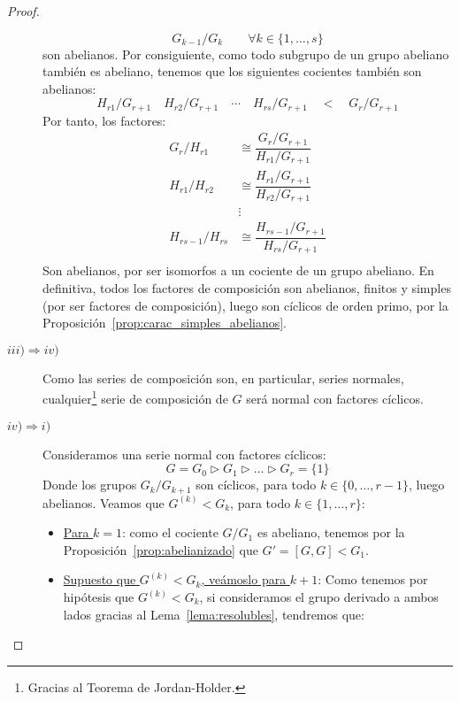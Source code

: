 \begin{teo}
\begin{proof}
\begin{description}
\begin{equation*}
                    G_{k-1}/G_k \qquad \forall k\in \{1,\ldots,s\}
                \end{equation*}
                son abelianos. Por consiguiente, como todo subgrupo de un grupo abeliano también es abeliano, tenemos que los siguientes cocientes también son abelianos:
                \begin{equation*}
                    H_{r1}/G_{r+1} \quad H_{r2}/G_{r+1} \quad \cdots \quad H_{rs}/G_{r+1} \quad < \quad G_r/G_{r+1}
                \end{equation*}
                Por tanto, los factores:
                \begin{align*}
                    G_r/H_{r1} &\cong \dfrac{G_r/G_{r+1}}{H_{r1}/G_{r+1}} \\
                    H_{r1}/H_{r2} &\cong \dfrac{H_{r1}/G_{r+1}}{H_{r2}/G_{r+1}} \\
                                  &\vdots \\
                    H_{rs-1}/H_{rs} &\cong \dfrac{H_{rs-1}/G_{r+1}}{H_{rs}/G_{r+1}} \\
                \end{align*}
                Son abelianos, por ser isomorfos a un cociente de un grupo abeliano. En definitiva, todos los factores de composición son abelianos, finitos y simples (por ser factores de composición), luego son cíclicos de orden primo, por la Proposición~\ref{prop:carac_simples_abelianos}.
            \item [$iii) \Longrightarrow iv)$] Como las series de composición son, en particular, series normales, cualquier\footnote{Gracias al Teorema de Jordan-Holder.} serie de composición de $G$ será normal con factores cíclicos.
            \item [$iv) \Longrightarrow i)$] Consideramos una serie normal con factores cíclicos:
                \begin{equation*}
                    G = G_0 \rhd G_1 \rhd \ldots \rhd G_r = \{1\}
                \end{equation*}
                Donde los grupos $G_k/G_{k+1}$ son cíclicos, para todo $k \in \{0, \ldots, r-1\}$, luego abelianos. Veamos que $G^{(k)} < G_k$, para todo $k \in \{1, \ldots, r\}$:
                \begin{itemize}
                    \item \underline{Para $k=1$}: como el cociente $G/G_1$ es abeliano, tenemos por la Proposición~\ref{prop:abelianizado} que $G' = [G, G] < G_1$.
                    \item \underline{Supuesto que $G^{(k)} < G_k$, veámoslo para $k+1$}: Como tenemos por hipótesis que $G^{(k)} < G_k$, si consideramos el grupo derivado a ambos lados gracias al Lema~\ref{lema:resolubles}, tendremos que:

\end{itemize}
\end{description}
\end{proof}
\end{teo}
